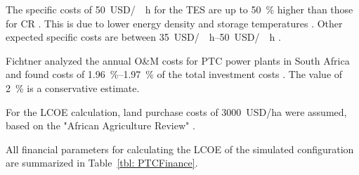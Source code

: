 The specific costs of \SI{50}{USD/\kilo\wattth\hour} for the TES are up to \SI{50}{\percent} higher than those for CR \cite{Platzer2014}. This is due to lower energy density and storage temperatures \cite{Steinmann2015}. Other expected specific costs are between \SIrange{35}{50}{USD/\kilo\wattth\hour} \cite{Steinmann2012}.

Fichtner analyzed the annual O\&M costs for PTC power plants in South Africa and found costs of \SIrange{1.96}{1.97}{\percent} of the total investment costs \cite{Fichtner2010}. The value of \SI{2}{\percent} is a conservative estimate.


For the LCOE calculation, land purchase costs of \SI{3000}{USD/\hectare} were assumed, based on the "African Agriculture Review" \cite{Cassell2012}.


All financial parameters for calculating the LCOE of the simulated configuration are summarized in Table~\ref{tbl: PTCFinance}.

